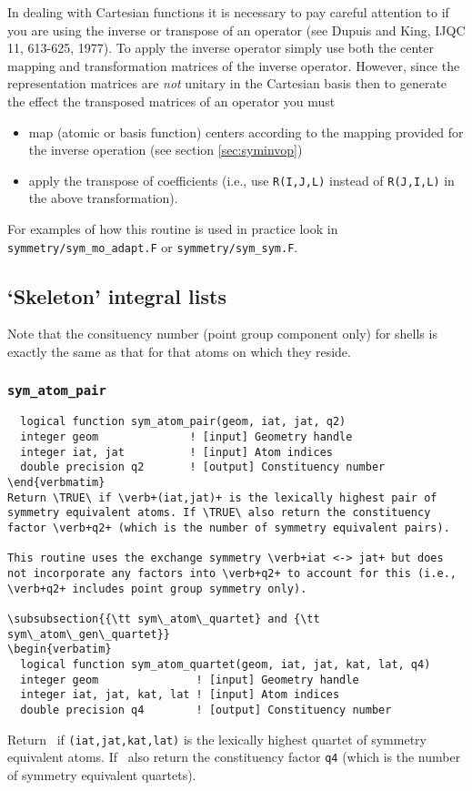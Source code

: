 In dealing with Cartesian functions it is necessary to pay careful
attention to if you are using the inverse or transpose of an operator
(see Dupuis and King, IJQC 11, 613-625, 1977).  To apply the inverse
operator simply use both the center mapping and transformation
matrices of the inverse operator.  However, since the representation
matrices are {\em not} unitary in the Cartesian basis then to generate
the effect the transposed matrices of an operator you must
\begin{itemize}
\item map (atomic or basis function) centers according to the mapping
  provided for the inverse operation (see section \ref{sec:syminvop})
\item apply the transpose of coefficients (i.e., use \verb+R(I,J,L)+
  instead of \verb+R(J,I,L)+ in the above transformation).
\end{itemize}

For examples of how this routine is used in practice look in
\verb+symmetry/sym_mo_adapt.F+ or \verb+symmetry/sym_sym.F+.

\subsection{`Skeleton' integral lists}

Note that the consituency number (point group component only) for
shells is exactly the same as that for that atoms on which they reside.

\subsubsection{{\tt sym\_atom\_pair}}
\begin{verbatim}
  logical function sym_atom_pair(geom, iat, jat, q2)
  integer geom              ! [input] Geometry handle
  integer iat, jat          ! [input] Atom indices
  double precision q2       ! [output] Constituency number
\end{verbmatim}
Return \TRUE\ if \verb+(iat,jat)+ is the lexically highest pair of
symmetry equivalent atoms. If \TRUE\ also return the constituency
factor \verb+q2+ (which is the number of symmetry equivalent pairs).

This routine uses the exchange symmetry \verb+iat <-> jat+ but does
not incorporate any factors into \verb+q2+ to account for this (i.e.,
\verb+q2+ includes point group symmetry only).

\subsubsection{{\tt sym\_atom\_quartet} and {\tt sym\_atom\_gen\_quartet}}
\begin{verbatim}
  logical function sym_atom_quartet(geom, iat, jat, kat, lat, q4)
  integer geom               ! [input] Geometry handle
  integer iat, jat, kat, lat ! [input] Atom indices
  double precision q4        ! [output] Constituency number
\end{verbatim}
Return \TRUE\ if \verb+(iat,jat,kat,lat)+ is the lexically highest
quartet of symmetry equivalent atoms. If \TRUE\ also return the
constituency factor \verb+q4+ (which is the number of symmetry
equivalent quartets).

